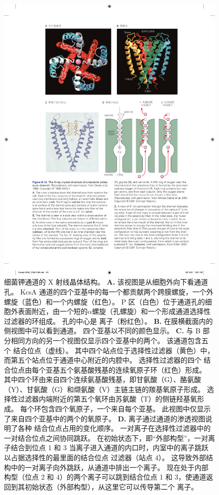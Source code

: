 \begin{figure}[htbp]
	\centering
	\includegraphics[width=0.9\linewidth]{chap08/fig_8_12}
	\caption{细菌钾通道的 X 射线晶体结构\cite{doyle1998structure}。
		\textbf{A.} 该视图是从细胞外向下看通道孔。
		KcsA  通道的四个亚基中的每一个都贡献两个跨膜螺旋，一个外螺旋（蓝色）和一个内螺旋（红色）。
		P 区（白色）位于通道孔的细胞外表面附近，由一个短的$\alpha$螺旋（孔螺旋）和一个形成通道选择性过滤器的环组成。
		孔的中心是  离子（粉红色）。
		\textbf{B.} 在膜横截面内的侧视图中可以看到通道。 四个亚基以不同的颜色显示。
		\textbf{C.} 与 B 部分相同方向的另一个视图仅显示四个亚基中的两个。
		该通道包含五个  结合位点（虚线）。
		其中四个站点位于选择性过滤器（黄色）中，而第五个站点位于通道中心附近的内腔中。
		选择性过滤器的四个  结合位点由每个亚基五个氨基酸残基的连续氧原子环（红色）形成。
		其中四个环由来自四个连续氨基酸残基，即甘氨酸（G）、酪氨酸（Y）、甘氨酸（G）和缬氨酸（V）主链主链的羰基氧原子形成。
		选择性过滤器内端附近的第五个氧环由苏氨酸（T）的侧链羟基氧形成。
		每个环包含四个氧原子，一个来自每个亚基。
		此视图中仅显示了来自四个亚基中的两个的氧原子\cite{morais2001energetic}。
		\textbf{D.}  离子通过通道的渗透视图说明了各种  结合位点占用的变化顺序。
		一对离子在选择性过滤器中的一对结合位点之间协同跳跃。
		在初始状态下，即“外部构型”，一对离子结合到位点 1 和 3
		当离子进入通道的内口时，内室中的离子跳跃以占据选择性的最里面的结合位点 过滤器（站点 4）。
		这导致外部结构中的一对离子向外跳跃，从通道中排出一个离子。
		现在处于内部构型（位点 2 和 4）的两个离子可以跳到结合位点 1 和 3，使通道返回到其初始状态（外部构型），从这里它可以传导第二个  离子\cite{miller2001see}。}
	\label{fig:8_12}
\end{figure}



